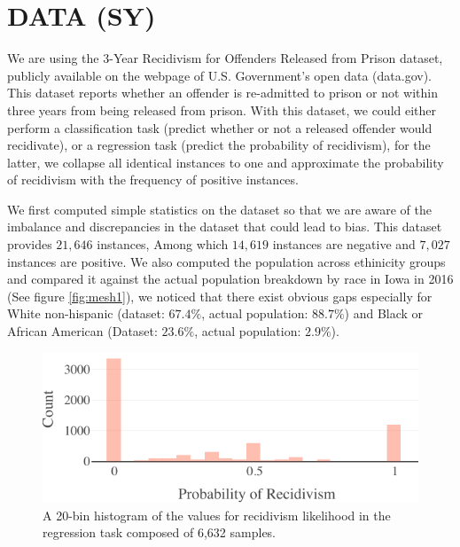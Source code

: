 \documentclass[sigconf]{acmart}
\begin{document}
\section{DATA (SY)}
\label{sec:data}
We are using the 3-Year Recidivism for Offenders Released from Prison dataset, publicly available on the webpage of U.S. Government’s open data (data.gov). This dataset reports whether an offender is re-admitted to prison or not within three years from being released from prison. With this dataset, we could either perform a classification task (predict whether or not a released offender would recidivate), or a regression task (predict the probability of recidivism), for the latter, we collapse all identical instances to one and approximate the probability of recidivism with the frequency of positive instances.

We first computed simple statistics on the dataset so that we are aware of the imbalance and discrepancies in the dataset that could lead to bias. This dataset provides $21,646$ instances, Among which $14,619$ instances are negative and $7,027$ instances are positive. We also computed the population across ethinicity groups and compared it against the actual population breakdown by race in Iowa in 2016 (See figure \ref{fig:mesh1}), we noticed that there exist obvious gaps especially for White non-hispanic (dataset: $67.4\%$, actual population: $88.7\%$) and Black or African American (Dataset: $23.6\%$, actual population: $2.9\%$). 

\begin{figure}
  \includegraphics[width=.48\textwidth]{regression_values_histogram.pdf}
  \caption{A 20-bin histogram of the values for recidivism likelihood in the regression task composed of 6,632 samples.}
  \label{fig:histogram_of_recidivism}
\end{figure}
\end{document}
